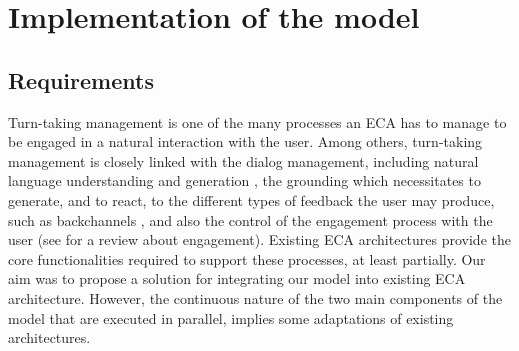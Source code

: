 \section{Implementation of the model}
\label{impl}

\subsection{Requirements}

Turn-taking management is one of the many processes an ECA has to manage to be engaged in a natural interaction with the user. 
Among others, turn-taking management is closely linked with 
the dialog management, including natural language understanding and generation \citep{skantze_towards_2010}, 
the grounding which necessitates to generate, and to react, to the different types of feedback the user may produce, such as backchannels \citep{kopp_dynamic_2014,bevacqua_multimodal_2010}, 
and also the control of the engagement process with the user (see \cite{clavel_fostering_2016} for a review about engagement). 
Existing ECA architectures provide the core functionalities required to support these processes, at least partially. 
Our aim was to propose a solution for integrating our model into existing ECA architecture.
However, the continuous nature of the two main components of the model that are executed in parallel, implies some adaptations of existing architectures. 





